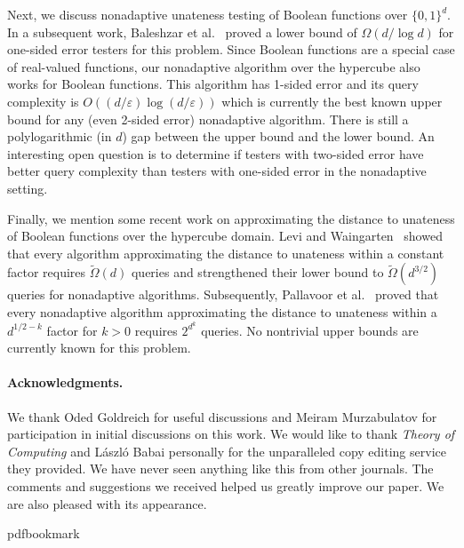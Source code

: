 \documentclass[11pt]{article}
\numberwithin{equation}{section}
\theoremstyle{definition}
\theoremstyle{plain}
\newcommand{\eps}{\varepsilon}
\begin{document}
Next, we discuss nonadaptive unateness testing of Boolean functions over $\{0,1\}^d$. In a subsequent work, Baleshzar et al.~\cite{BCPRS17b} proved a lower bound of $\Omega\left({d}/{\log d} \right)$ for one-sided error testers for this problem.
Since Boolean functions are a special case of real-valued functions,
our nonadaptive algorithm over the hypercube also works for Boolean functions.
This algorithm has 1-sided error and its query complexity  is $O\left(({d}/{\eps})\log ({d}/{\eps})\right)$ which is currently the best known upper bound for any (even 2-sided error) nonadaptive algorithm. There is still a polylogarithmic (in $d$) gap between the upper bound and the lower bound.
An interesting open question is to determine if testers with two-sided error have better query complexity than testers with one-sided error in the nonadaptive setting.
%

Finally, we mention some recent work on approximating the distance to unateness of Boolean functions over the hypercube domain. Levi and Waingarten~\cite{LW19} showed that every algorithm approximating the distance to unateness within a constant factor requires $\widetilde{\Omega}(d)$ queries and strengthened their lower bound to $\widetilde{\Omega}(d^{3/2})$ queries for nonadaptive algorithms. Subsequently, Pallavoor et al.~\cite{PRW20} proved that every nonadaptive algorithm approximating the distance to unateness within a $d^{1/2 - k}$ factor for $k > 0$ requires $2^{d^k}$ queries. No nontrivial upper bounds are currently known for this problem.

\paragraph{Acknowledgments.} We thank Oded Goldreich for useful discussions and Meiram Murzabulatov for participation in initial discussions on this work.
%
We would like to thank \emph{Theory of Computing} and L\'aszl\'o Babai 
personally
for the unparalleled copy editing service they provided. We have never seen
anything like this from other journals. The comments and suggestions we
received helped us greatly improve our paper. We are also pleased with its
appearance. 


\newcommand{\prelim}{Preliminary version in\ }
\providecommand{\bibhead}[1]{}
\expandafter\ifx\csname pdfbookmark\endcsname\relax%
  \providecommand{\tocrefpdfbookmark}{}
\else\providecommand{\tocrefpdfbookmark}{%
   \hypertarget{tocreferences}{}%
   \pdfbookmark[1]{References}{tocreferences}}%
\fi
\end{document}
